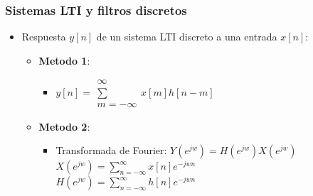 \documentclass{beamer}
\numberwithin{section}{part}
\begin{document}
  
  \begin{frame}
  \frametitle{Sistemas LTI y filtros discretos}
  
  \begin{itemize}
    \item Respuesta $y[n]$ de un sistema LTI discreto a una entrada $x[n]$:
    \begin{itemize}
      \vspace{0.2cm}
      \item \textbf{Metodo 1}:
      \begin{itemize}
        \item $y[n]=\substack{\infty\\\sum\\m=-\infty} x[m]h[n-m]$
      \end{itemize}  
      \vspace{0.2cm}
      \item \textbf{Metodo 2}:
      \begin{itemize}
        \item Transformada de Fourier: $Y(e^{jw})=H(e^{jw})X(e^{jw})$\\
        \vspace{0.1cm}
        $X(e^{jw})=\sum_{n=-\infty}^{\infty} x[n] e^{-jwn}$\\
        $H(e^{jw})=\sum_{n=-\infty}^{\infty} h[n] e^{-jwn}$
      \end{itemize}  
    \end{itemize}  
  \end{itemize}

\end{frame}
\end{document}
